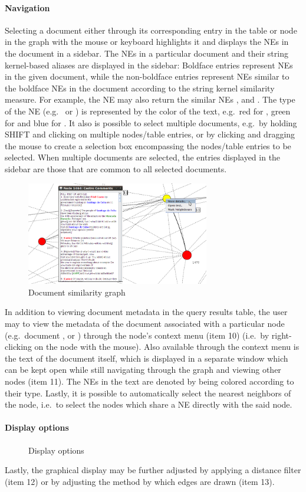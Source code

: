 \paragraph{Navigation}
Selecting a document either through its corresponding entry in the table or node in the graph with the mouse or keyboard highlights it and displays the NEs in the document in a sidebar. The NEs in a particular document and their string kernel-based aliases are displayed in the sidebar: Boldface entries represent NEs in the given document, while the non-boldface entries represent NEs similar to the boldface NEs in the document according to the string kernel similarity measure. For example, the NE \textbf{} may also return the similar NEs ,  and . The type of the NE (e.g.\  or ) is represented by the color of the text, e.g.\ red for , green for  and blue for . It also is possible to select multiple documents, e.g.\ by holding SHIFT and clicking on multiple nodes/table entries, or by clicking and dragging the mouse to create a selection box encompassing the nodes/table entries to be selected. When multiple documents are selected, the entries displayed in the sidebar are those that are common to all selected documents.

\begin{figure}[h]
\centering
\caption{Document similarity graph}
\includegraphics[width=80mm]{nodeclick.png}
\end{figure}

In addition to viewing document metadata in the query results table, the user may to view the metadata of the document associated with a particular node (e.g.\ document ,  or ) through the node's context menu (item 10) (i.e.\ by right-clicking on the node with the mouse). Also available through the context menu is the text of the document itself, which is displayed in a separate window which can be kept open while still navigating through the graph and viewing other nodes (item 11). The NEs in the text are denoted by being colored according to their type. Lastly, it is possible to automatically select the nearest neighbors of the node, i.e.\ to select the nodes which share a NE directly with the said node.

\paragraph{Display options}

\begin{figure}[h]
\centering
\caption{Display options}
\end{figure}

Lastly, the graphical display may be further adjusted by applying a distance filter (item 12) or by adjusting the method by which edges are drawn (item 13).